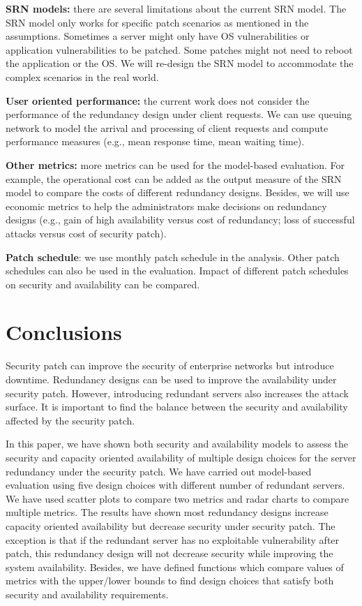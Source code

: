 \documentclass[conference]{IEEEtran}
\begin{document}
\textbf{SRN models:} there are several limitations about the current SRN model. The SRN model only works for specific patch scenarios as mentioned in the assumptions. Sometimes a server might only have OS vulnerabilities or application vulnerabilities to be patched. Some patches might not need to reboot the application or the OS. We will re-design the SRN model to accommodate the complex scenarios in the real world. 

\textbf{User oriented performance:} the current work does not consider the performance of the redundancy design under client requests. We can use queuing network to model the arrival and processing of client requests and compute performance measures (e.g., mean response time, mean waiting time).

\textbf{Other metrics:} more metrics can be used for the model-based evaluation. For example, the operational cost can be added as the output measure of the SRN model to compare the costs of different redundancy designs. Besides, we will use economic metrics to help the administrators make decisions on redundancy designs (e.g., gain of high availability versus cost of redundancy; loss of successful attacks versus cost of security patch).

\textbf{Patch schedule}: we use monthly patch schedule in the analysis. Other patch schedules can also be used in the evaluation. Impact of different patch schedules on security and availability can be compared.

\section{Conclusions}
\label{conclusion}

Security patch can improve the security of enterprise networks but introduce downtime. Redundancy designs can be used to improve the availability under security patch. However, introducing redundant servers also increases the attack surface. It is important to find the balance between the security and availability affected by the security patch. 

In this paper, we have shown both security and availability models to assess the security and capacity oriented availability of multiple design choices for the server redundancy under the security patch. We have carried out model-based evaluation using five design choices with different number of redundant servers. We have used scatter plots to compare two metrics and radar charts to compare multiple metrics. The results have shown most redundancy designs increase capacity oriented availability but decrease security under security patch. The exception is that if the redundant server has no exploitable vulnerability after patch, this redundancy design will not decrease security while improving the system availability. Besides, we have defined functions which compare values of metrics with the upper/lower bounds to find design choices that satisfy both security and availability requirements.



\end{document}
